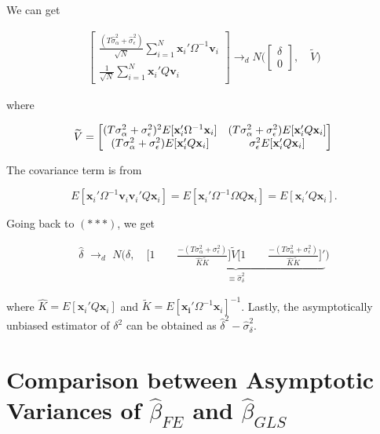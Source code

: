 \documentclass[11pt]{article}
\begin{document}
We can get

\begin{align*}
  \begin{bmatrix}
\frac{(T\widehat{\sigma}_\alpha^2 + \widehat{\sigma}_\epsilon^2) }{\sqrt{N}} \sum_{i=1}^N \mathbf{x}_i' \Omega^{-1} \mathbf{v}_i  \\
\frac{1}{\sqrt{N}} \sum_{i=1}^N \mathbf{x}_i' Q \mathbf{v}_i  
\end{bmatrix} \rightarrow_d N\bigg( \begin{bmatrix}
\delta \\
0  
\end{bmatrix} , \quad  \widetilde{V}   \bigg)
\end{align*}

where 

\[
\widetilde{V} =  \begin{bmatrix}
(T\sigma_\alpha^2 + \sigma_\epsilon^2)^2 E[\mathbf{x}_i' \Omega^{-1} \mathbf{x}_i] & (T\sigma_\alpha^2 + \sigma_\epsilon^2) E[\mathbf{x}_i' Q \mathbf{x}_i] \\
 (T\sigma_\alpha^2 + \sigma_\epsilon^2) E[\mathbf{x}_i' Q \mathbf{x}_i] & \sigma_\epsilon^2 E[\mathbf{x}_i' Q \mathbf{x}_i]
\end{bmatrix} \\
\]

The covariance term is from 

\[
E[\mathbf{x}_i'\Omega^{-1}\mathbf{v}_i \mathbf{v}_i' Q \mathbf{x}_i] = E[\mathbf{x}_i' \Omega^{-1} \Omega Q \mathbf{x}_i] = E[\mathbf{x}_i' Q \mathbf{x}_i].
\]



Going back to $(***)$, we get

\begin{align*}
\widehat{\delta} \,\,  \rightarrow_d \,\, N\bigg(\delta, \quad \underbrace{   \bigg [1 \qquad \frac{-(T\sigma_\alpha^2 + \sigma_\epsilon^2)}{\widehat{K}\widetilde{K}} \bigg ]  \widetilde{V}   \bigg [1 \qquad \frac{-(T\sigma_\alpha^2 + \sigma_\epsilon^2)}{\widehat{K}\widetilde{K}} \bigg ]' }_{\equiv \widehat{\sigma}_\delta^2}\bigg)
\end{align*}

where $\widehat{K} = E[\mathbf{x}_i' Q \mathbf{x}_i]$ and $\widetilde{K}=E[\mathbf{x_i}' \Omega^{-1} \mathbf{x}_i]^{-1}$. Lastly, the asymptotically unbiased estimator of $\delta^2$ can be obtained as $\widehat{\delta}^2 - \widehat{\sigma}_\delta^2$.




\section*{Comparison between Asymptotic Variances of $\widehat{\beta}_{FE}$ and $\widehat{\beta}_{GLS}$}
\end{document}
